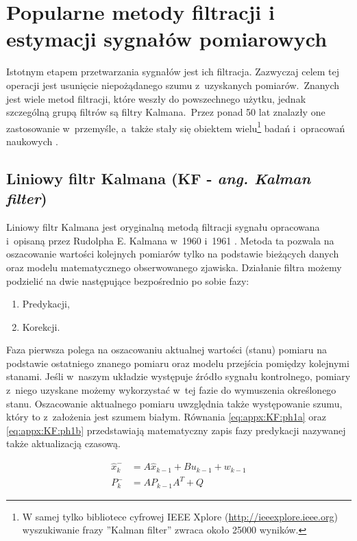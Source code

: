 \chapter{Popularne metody filtracji i estymacji sygnałów pomiarowych}
\label{chap:appx:filters}
Istotnym etapem przetwarzania sygnałów jest ich filtracja. Zazwyczaj celem tej operacji jest usunięcie niepożądanego szumu z~uzyskanych pomiarów.~Znanych jest wiele metod filtracji, które weszły do powszechnego użytku, jednak szczególną grupą filtrów są filtry Kalmana.~Przez ponad 50 lat znalazły one zastosowanie w~przemyśle, a~także stały się obiektem wielu\footnote{W samej tylko bibliotece cyfrowej IEEE Xplore (\url{http://ieeexplore.ieee.org}) wyszukiwanie frazy ''Kalman filter'' zwraca około 25000 wyników.} badań i~opracowań naukowych \cite{Droleta,Welch2006, Kedzierski2007, Huo2014, Pandey2014}.

\section*{Liniowy filtr Kalmana (KF - \emph{ang. Kalman filter})}
\label{sec:appx:filters:KF}
Liniowy filtr Kalmana jest oryginalną metodą filtracji sygnału opracowana i~opisaną przez Rudolpha E. Kalmana w~1960 \cite{Kalman1960} i~1961 \cite{KalmanBucy1961}. Metoda ta pozwala na oszacowanie wartości kolejnych pomiarów tylko na podstawie bieżących danych oraz modelu matematycznego obserwowanego zjawiska. Działanie filtra możemy podzielić na dwie następujące bezpośrednio po sobie fazy: 
\begin{enumerate}
	\item Predykacji,
	\item Korekcji.
\end{enumerate}

Faza pierwsza polega na oszacowaniu aktualnej wartości (stanu) pomiaru na podstawie ostatniego znanego pomiaru oraz modelu przejścia pomiędzy kolejnymi stanami. Jeśli w~naszym układzie występuje źródło sygnału kontrolnego, pomiary z~niego uzyskane możemy wykorzystać w~tej fazie do wymuszenia określonego stanu. Oszacowanie aktualnego pomiaru uwzględnia także występowanie szumu, który to z~założenia jest szumem białym. Równania \ref{eq:appx:KF:ph1a} oraz \ref{eq:appx:KF:ph1b} przedstawiają matematyczny zapis fazy predykacji nazywanej także aktualizacją czasową.

\begin{subequations}
	\begin{align}
		\widehat{x}^-_k & = A\widehat{x}_{k-1} + Bu_{k-1} + w_{k-1}\label{eq:appx:KF:ph1a} \\
		P^-_k           & = AP_{k-1}A^T + Q \label{eq:appx:KF:ph1b}                        
	\end{align}
\end{subequations}

